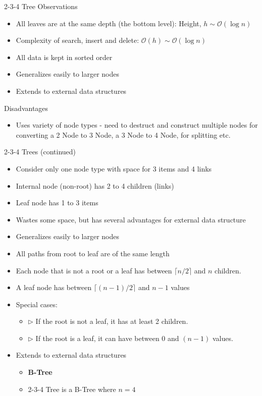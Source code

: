 \documentclass[aspectratio=169, xcolor=dvipsnames]{beamer}
\begin{document}
\begin{frame}{2-3-4 Tree Observations}
    \begin{itemize}[<+->]
        \item All leaves are at the same depth (the bottom level): Height, $h \sim \mathcal{O}(\log n)$
        \item Complexity of search, insert and delete: $\mathcal{O}(h) \sim \mathcal{O}(\log n)$
        \item All data is kept in sorted order
        \item Generalizes easily to larger nodes
        \item Extends to external data structures
    \end{itemize}
    \begin{alertblock}{Disadvantages}
        \begin{itemize}[<+->]
            \item Uses variety of node types - need to destruct and construct multiple nodes for converting a 2 Node to 3 Node, a 3 Node to 4 Node, for splitting etc.
        \end{itemize}
    \end{alertblock}
\end{frame}

\begin{frame}{2-3-4 Trees (continued)}
    \begin{itemize}[<+->]
        \item Consider only one node type with space for 3 items and 4 links
        \item Internal node (non-root) has 2 to 4 children (links)
        \item Leaf node has 1 to 3 items
        \item Wastes some space, but has several advantages for external data structure
        \item Generalizes easily to larger nodes
        \item All paths from root to leaf are of the same length
        \item Each node that is not a root or a leaf has between $\lceil n/2 \rceil$ and $n$ children.
        \item A leaf node has between $\lceil (n-1)/2 \rceil$ and $n-1$ values
        \item Special cases:
        \begin{itemize}[<+->]
            \item $\triangleright$ If the root is not a leaf, it has at least 2 children.
            \item $\triangleright$ If the root is a leaf, it can have between 0 and $(n-1)$ values.
        \end{itemize}
        \item Extends to external data structures
        \begin{itemize}[<+->]
            \item \textbf{B-Tree}
            \item 2-3-4 Tree is a B-Tree where $n = 4$
        \end{itemize}
    \end{itemize}
\end{frame}
\end{document}
